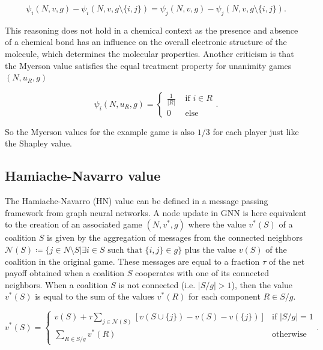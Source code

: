 \begin{equation}
    \psi_i(N, v, g) - \psi_i(N, v, g \setminus \{i, j\}) = \psi_j(N, v, g) - \psi_j(N, v, g \setminus \{i, j\}).
\end{equation}


This reasoning does not hold in a chemical context as the presence and absence 
of a chemical bond has an influence on the overall electronic structure 
of the molecule, which determines the molecular properties.\cite{atkins2011molecular} 
Another criticism is that the Myerson value satisfies the equal treatment 
property for unanimity games $(N, u_R, g)$\cite{hamiache_value_1999}


\begin{equation}
    \psi_i(N, u_R, g) = \begin{cases}
        \frac{1}{|R|} & \text{ if } i \in R \\
        0 & \text{ else }
    \end{cases}.
\end{equation}


So the Myerson values for the example game is also $1/3$ for each player just 
like the Shapley value.


\subsection{Hamiache-Navarro value}


The Hamiache-Navarro (HN) value can be defined in a message passing framework from graph
neural networks. A node update in GNN is here equivalent to the creation of 
an associated game $\left(N, v^*, g\right)$ where the value $v^*(S)$ of a 
coalition $S$ is given by the aggregation of messages from the connected neighbors 
$\mathcal{N}(S) \coloneqq \{ j \in N \setminus S | \exists i \in S \text{ such that } \{i, j\} \in g \}$
plus the value $v(S)$ of the coalition in the original game.
These messages are equal to a fraction $\tau$ of the net payoff obtained when a coalition $S$ cooperates 
with one of its connected neighbors. When a coalition $S$ is not connected (i.e. $|S/g| > 1$), then the 
value $v^*(S)$ is equal to the sum of the values $v^*(R)$ for each component $R \in S/g$.
\cite{zhang2022gstarx, hamiache2001associated}


\begin{equation}
	\label{eq:associated_game}
	v^*(S) =
	\begin{cases}
		\displaystyle
        v(S) + \tau \sum_{j \in \mathcal{N}(S)} \left[ v(S \cup \{j\}) - v(S) - v(\{j\}) \right] & \text{if } |S/g| = 1 \\
		\displaystyle
		\sum_{R \in S/g} v^*(R)                                                                   & \text{otherwise}
	\end{cases}
	.
\end{equation}


